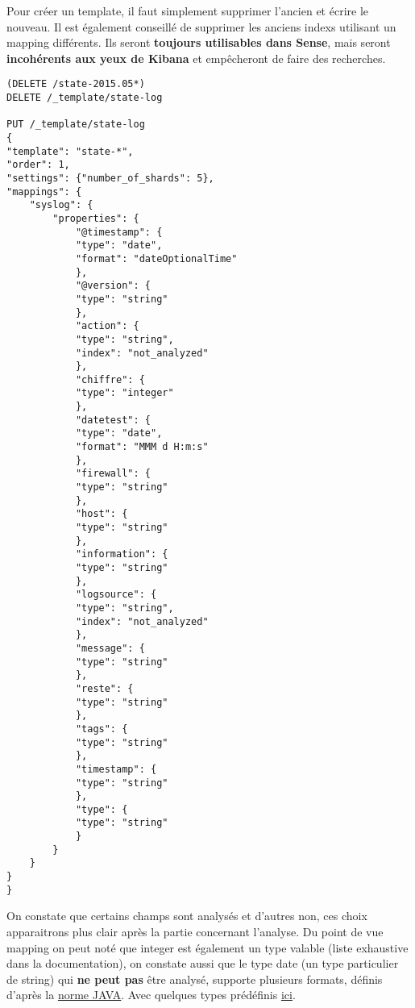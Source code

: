 Pour créer un template, il faut simplement supprimer l'ancien et écrire le nouveau.
Il est également conseillé de supprimer les anciens indexs utilisant un mapping 
différents. Ils seront \textbf{toujours utilisables dans Sense}, mais seront 
\textbf{incohérents aux yeux de Kibana} et empêcheront de faire des recherches.


\begin{lstlisting}[style=code,label={lst:mappingput2},caption={Ajouter un template de mapping}]
(DELETE /state-2015.05*)
DELETE /_template/state-log

PUT /_template/state-log
{
"template": "state-*",
"order": 1,
"settings": {"number_of_shards": 5},
"mappings": {
    "syslog": {
        "properties": {
            "@timestamp": {
            "type": "date",
            "format": "dateOptionalTime"
            },
            "@version": {
            "type": "string"
            },
            "action": {
            "type": "string",
            "index": "not_analyzed"
            },
            "chiffre": {
            "type": "integer"
            },
            "datetest": {
            "type": "date",
            "format": "MMM d H:m:s"              
            },
            "firewall": {
            "type": "string"
            },
            "host": {
            "type": "string"
            },
            "information": {
            "type": "string"
            },
            "logsource": {
            "type": "string",
            "index": "not_analyzed"
            },
            "message": {
            "type": "string"
            },
            "reste": {
            "type": "string"
            },
            "tags": {
            "type": "string"
            },
            "timestamp": {
            "type": "string"
            },
            "type": {
            "type": "string"
            }
        }
    }
}
}
\end{lstlisting}
On constate que certains champs sont analysés et d'autres non, ces choix apparaitrons
plus clair après la partie concernant l'analyse.
Du point de vue mapping on peut noté que integer est également un type valable (liste 
exhaustive dans la documentation), on constate aussi que le type date (un type particulier
de string) qui \textbf{ne peut pas} être analysé, supporte plusieurs formats, définis
d'après la \hyperref[http://joda-time.sourceforge.net/api-release/org/joda/time/format/DateTimeFormat.html]{norme JAVA}.
Avec quelques types prédéfinis \hyperref[https://www.elastic.co/guide/en/elasticsearch/reference/1.5/mapping-date-format.html]{ici}.


